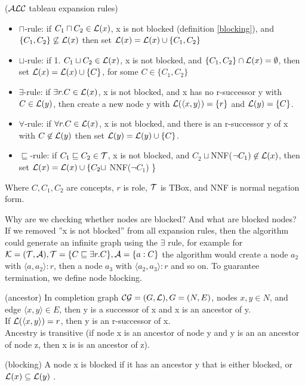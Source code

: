 \begin{mydef} \cite{handbook2} ($\mathcal{ALC}$ tableau expansion rules)
\begin{itemize}
\item $\sqcap$-rule: if 	 $C_1 \sqcap C_2 \in \mathcal{L} (x)$, x is not blocked (definition \ref{blocking}), and 
$\{C_1, C_2\} \not\subseteq  \mathcal{L} (x)$
then set $\mathcal{L} (x) = \mathcal{L} (x) \cup \{C_1, C_2\}$
\item $\sqcup$-rule: if 1. $C_1 \sqcup C_2 \in \mathcal{L} (x)$, x is not blocked, and 
$\{C_1, C_2\} \cap  \mathcal{L} (x) = \emptyset$,
then set $\mathcal{L} (x) = \mathcal{L} (x) \cup \{C\}$, for some $C \in \{C_1,C_2\}$
\item $\exists$-rule: if  $\exists r.C \in \mathcal{L} (x)$, x is not blocked, and
x has no r-successor y with $C \in \mathcal{L} (y)$,
then create a new node y with $\mathcal{L} (\langle x, y \rangle) = \{r\}$ and $\mathcal{L} (y) = \{C\}$.
\item $\forall$-rule: if $\forall r.C \in \mathcal{L} (x)$, x is not blocked, and
there is an r-successor y of x with $C \not\in \mathcal{L} (y)$
then set $\mathcal{L}(y) = \mathcal{L}(y) \cup \{C\}$.
\item $\sqsubseteq$-rule: if  $C_1 \sqsubseteq C_2 \in \mathcal{T} $, x is not blocked, and
$C_2 \sqcup $NNF($\neg C_1) \not\in \mathcal{L} (x)$,
then set $\mathcal{L} (x) = \mathcal{L} (x) \cup \{C_2 \sqcup$ NNF($\neg C_1$) \} 
\end{itemize}
Where $C, C_1, C_2$ are concepts, $r$ is role, $\mathcal{T}$ is TBox, and NNF is normal negation form.
\end{mydef}

Why are we checking whether nodes are blocked? And what are blocked nodes? \\
If we removed ''x is not blocked'' from all expansion rules, then the algorithm could generate an infinite graph using the $\exists$ rule, for example for 
$\mathcal{K} =(\mathcal{T} ,\mathcal{A}), \mathcal{T} = \{C \sqsubseteq \exists r.C \}, \mathcal{A}=\{a:C\}$ the algorithm would create a node $a_2$ with $\langle a,a_2 \rangle :r$, then a node $a_3$ with $\langle a_2,a_3\rangle :r$ and so on.
To guarantee termination, we define node blocking.
\begin{mydef} \label{ancestor} (ancestor)
In completion graph $\mathcal{CG} = (G, \mathcal{L}), G=(N,E)$, nodes $x,y \in N$, and edge $\langle x,y \rangle \in E$, then y is a successor of x and x is an ancestor of y. \\
If $\mathcal{L} (\langle x,y \rangle) = r$, then y is an r-successor of x. \\
Ancestry is transitive (if node x is an ancestor of node y and y is an an ancestor of node z, then x is is an ancestor of z).

\end{mydef}
\begin{mydef} \label{blocking}(blocking)
A node x is blocked if it has an ancestor y that is either blocked, or $\mathcal{L} (x) \subseteq \mathcal{L} (y)$ .
\end{mydef}

